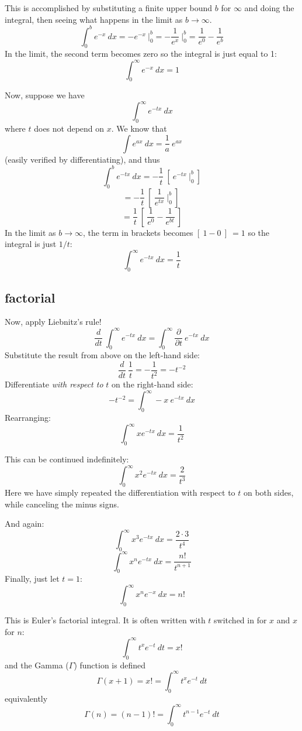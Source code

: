 \documentclass[11pt, oneside]{article}
\begin{document}
This is accomplished by substituting a finite upper bound $b$ for $\infty$ and doing the integral, then seeing what happens in the limit as $b \rightarrow \infty$.
\[ \int_0^b e^{-x} \ dx = -e^{-x} \ \bigg |_0^b =  -\frac{1}{e^{x}} \ \bigg |_0^b = \frac{1}{e^0} - \frac{1}{e^b} \]
In the limit, the second term becomes zero so the integral is just equal to 1:
\[ \int_0^{\infty} e^{-x} \ dx  = 1 \]

Now, suppose we have
\[ \int_0^{\infty} e^{-tx} \ dx \]
where $t$ does not depend on $x$.
We know that
\[ \int e^{ax} \ dx = \frac{1}{a} \ e^{ax} \]
(easily verified by differentiating), and thus
\[ \int_0^b e^{-tx} \ dx = -\frac{1}{t} \ [ \ e^{-tx} \ \bigg |_0^b \ ] \]
\[ =  -\frac{1}{t} \ [ \  \frac{1}{e^{tx}} \ \bigg |_0^b \ ] \ \]
\[ = \frac{1}{t} \ [ \ \frac{1}{e^0} - \frac{1}{e^{bt}} \ ]  \]
In the limit as $b \rightarrow \infty$, the term in brackets becomes $ [ \ 1-0 \ ] \ = 1$ so the integral is just $1/t$:
\[ \int_0^{\infty} e^{-tx} \ dx  = \frac{1}{t} \]

\subsection*{factorial}

Now, apply Liebnitz's rule!
\[ \frac{d}{dt} \ \int_0^{\infty} e^{-tx} \ dx = \int_0^{\infty} \frac{\partial}{\partial t} \  e^{-tx} \ dx \]
Substitute the result from above on the left-hand side:
\[ \frac{d}{dt} \ \frac{1}{t} = - \frac{1}{t^2} = - t^{-2} \]
Differentiate \emph{with respect to} $t$ on the right-hand side:
\[ -t^{-2} = \int_0^{\infty} -x \  e^{-tx} \ dx \]
Rearranging:
\[ \int_0^{\infty} x e^{-tx} \ dx = \frac{1}{t^{2}} \]

This can be continued indefinitely:
\[ \int_0^{\infty} x^2 e^{-tx} \ dx = \frac{2}{t^{3}} \]
Here we have simply repeated the differentiation with respect to $t$ on both sides, while canceling the minus signs.

And again:
\[ \int_0^{\infty} x^3 e^{-tx} \ dx = \frac{2 \cdot 3}{t^{4}} \]
\[ \int_0^{\infty} x^n e^{-tx} \ dx = \frac{n!}{t^{n+1}} \]
Finally, just let $t=1$:
\[  \int_0^{\infty} x^n e^{-x} \ dx = n!  \]

This is Euler's factorial integral.  It is often written with $t$ switched in for $x$ and $x$ for $n$:
\[  \int_0^{\infty} t^x e^{-t} \ dt = x!  \]
and the Gamma ($\Gamma$) function is defined
\[ \Gamma(x+1) = x! =  \int_0^{\infty} t^x e^{-t} \ dt \]
equivalently
\[ \Gamma(n) = (n-1)! =  \int_0^{\infty} t^{n-1} e^{-t} \ dt \]
\end{document}
